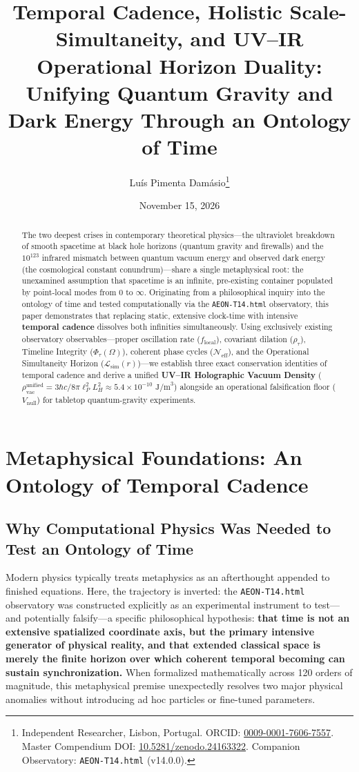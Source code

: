 \documentclass[11pt,a4paper]{article}
\title{\textbf{Temporal Cadence, Holistic Scale-Simultaneity, and UV--IR Operational Horizon Duality: Unifying Quantum Gravity and Dark Energy Through an Ontology of Time}}
\author{Luís Pimenta Damásio\thanks{Independent Researcher, Lisbon, Portugal. ORCID: \href{https://orcid.org}{0009-0001-7606-7557}. Master Compendium DOI: \href{https://doi.org}{10.5281/zenodo.24163322}. Companion Observatory: \texttt{AEON-T14.html} (v14.0.0).}}
\date{November 15, 2026}
\begin{document}
\maketitle

\begin{abstract}
The two deepest crises in contemporary theoretical physics---the ultraviolet breakdown of smooth spacetime at black hole horizons (quantum gravity and firewalls) and the $10^{123}$ infrared mismatch between quantum vacuum energy and observed dark energy (the cosmological constant conundrum)---share a single metaphysical root: the unexamined assumption that spacetime is an infinite, pre-existing container populated by point-local modes from $0$ to $\infty$. Originating from a philosophical inquiry into the ontology of time and tested computationally via the \texttt{AEON-T14.html} observatory, this paper demonstrates that replacing static, extensive clock-time with intensive \textbf{temporal cadence} dissolves both infinities simultaneously. Using exclusively existing observatory observables---proper oscillation rate ($f_{\mathrm{local}}$), covariant dilation ($\rho_\tau$), Timeline Integrity ($\Phi_\tau(\Omega)$), coherent phase cycles ($\mathcal{N}_{\mathrm{eff}}$), and the Operational Simultaneity Horizon ($\mathcal{L}_{\mathrm{sim}}(r)$)---we establish three exact conservation identities of temporal cadence and derive a unified \textbf{UV--IR Holographic Vacuum Density} ($\rho_{\mathrm{vac}}^{\mathrm{unified}} = 3\hbar c / 8\pi \ell_P^2 L_H^2 \approx 5.4 \times 10^{-10}\text{ J/m}^3$) alongside an operational falsification floor ($V_{\mathrm{null}}$) for tabletop quantum-gravity experiments.
\end{abstract}

\section{Metaphysical Foundations: An Ontology of Temporal Cadence}

\subsection{Why Computational Physics Was Needed to Test an Ontology of Time}
Modern physics typically treats metaphysics as an afterthought appended to finished equations. Here, the trajectory is inverted: the \texttt{AEON-T14.html} observatory \cite{damasio_aeont14} was constructed explicitly as an experimental instrument to test---and potentially falsify---a specific philosophical hypothesis: \textbf{that time is not an extensive spatialized coordinate axis, but the primary intensive generator of physical reality, and that extended classical space is merely the finite horizon over which coherent temporal becoming can sustain synchronization.} When formalized mathematically across 120 orders of magnitude, this metaphysical premise unexpectedly resolves two major physical anomalies without introducing ad hoc particles or fine-tuned parameters.
\end{document}
